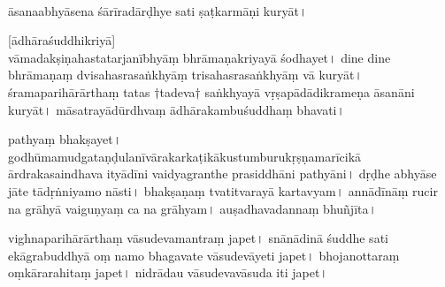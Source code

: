 


{}


\newpage

\begin{HalfText}
\begin{sans}
[ṣaṭkarmāṇi]\\%
āsana{}abhyāsena śārīradārḍhye sati ṣaṭkarmāṇi kuryāt\!।

[ādhāraśuddhikriyā]\\ %
vāmadakṣiṇahastatarjanībhyāṃ bhrāmaṇakriyayā śodhayet\!। dine dine bhrāmaṇaṃ\endnote{bhrāmaṇaṃ~] P, brāhmaṇaṃ M.} dvisahasrasaṅkhyāṃ trisahasrasaṅkhyāṃ vā kuryāt\!। śramaparihārārthaṃ tatas $\dagger$tadeva$\dagger$ saṅkhyayā vṛṣapādādikrameṇa āsanāni kuryāt\!। māsatrayādūrdhvaṃ ādhārakambuśuddhaṃ bhavati\!। 

pathyaṃ bhakṣayet\!। godhūmamudgataṇḍulanīvārakarkaṭikākustumburukṛṣṇamarīcikā ārdrakasaindhava\endnote{ārdraka°~] P, ārdrāka° M.} ityādīni vaidyagranthe prasiddhāni pathyāni\!। dṛḍhe abhyāse jāte tādṛṅniyamo nāsti\!। bhakṣaṇaṃ tvatitvarayā kartavyam\!। annādīnāṃ rucir na grāhyā vaiguṇyaṃ ca na grāhyam\!। auṣadhavadannaṃ\endnote{auṣadhavad~] \textit{corr.}, atāṣadhavad M.} bhuñjīta\!। 

vighnaparihārārthaṃ vāsudevamantraṃ japet\!। snānādinā śuddhe sati ekāgrabuddhyā\endnote{ekāgra°~] P, ekrāgra° M.} oṃ namo bhagavate vāsudevāyeti japet\!। bhojanottaraṃ oṃkārarahitaṃ japet\!। nidrādau vāsudevavāsuda iti japet\!। 
\end{sans}
\end{HalfText}

